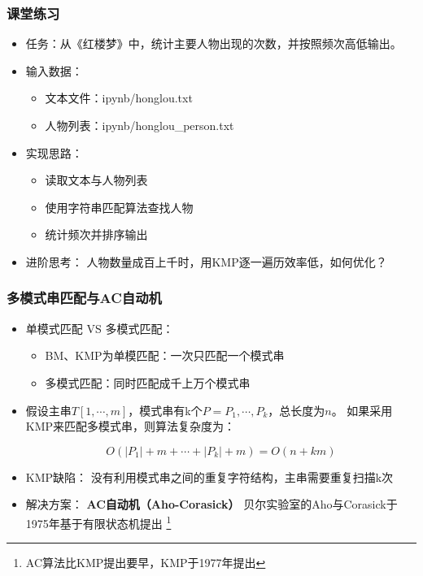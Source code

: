 \begin{frame}[fragile]
  \frametitle{课堂练习}
  \begin{itemize}
  \item 任务：从《红楼梦》中，统计主要人物出现的次数，并按照频次高低输出。
  \item 输入数据：
    \begin{itemize}
    \item 文本文件：ipynb/honglou.txt
    \item 人物列表：ipynb/honglou\_person.txt
    \end{itemize}
  \item 实现思路：
    \begin{itemize}
    \item 读取文本与人物列表
    \item 使用字符串匹配算法查找人物
    \item 统计频次并排序输出
    \end{itemize}
  \item 进阶思考：
    人物数量成百上千时，用KMP逐一遍历效率低，如何优化？
  \end{itemize}
\end{frame}


\begin{frame}[fragile]
  \frametitle{多模式串匹配与AC自动机}
    \begin{itemize}
    \item 单模式匹配 VS 多模式匹配：
      \begin{itemize}
      \item BM、KMP为单模匹配：一次只匹配一个模式串
      \item 多模式匹配：同时匹配成千上万个模式串
      \end{itemize}
    \item 假设主串$T[1, \cdots, m]$，模式串有k个$P={P_1,\cdots,P_k}$，总长度为$n$。
    如果采用KMP来匹配多模式串，则算法复杂度为：

    \[O(|P_1|+m+\cdots+|P_k|+m)=O(n+km)\]
  
    \item KMP缺陷：
      没有利用模式串之间的重复字符结构，主串需要重复扫描k次

    \item 解决方案：
      \textbf{AC自动机（Aho-Corasick）}
      贝尔实验室的Aho与Corasick于1975年基于有限状态机提出
      \footnote{AC算法比KMP提出要早，KMP于1977年提出}
  \end{itemize}
\end{frame}

